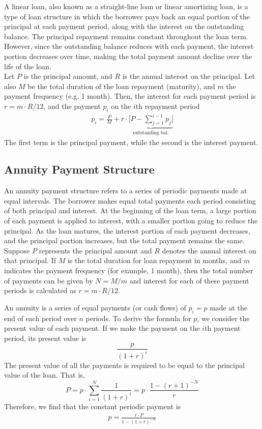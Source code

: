 \documentclass[11pt]{report}
\begin{document}
A linear loan, also known as a straight-line loan or linear amortizing loan, is a type of loan structure in which the borrower pays back an equal portion of the principal at each payment period, along with the interest on the outstanding balance. The principal repayment remains constant throughout the loan term. However, since the outstanding balance reduces with each payment, the interest portion decreases over time, making the total payment amount decline over the life of the loan.\\

Let $P$ is the principal amount, and $R$ is the annual interest on the principal. Let also $M$ be the total duration of the loan repayment (maturity), and $m$ the payment frequency (e.g. 1 month). Then, the interest for each payment period is $r=m\cdot R/12$, and the payment $p_i$ on the $i$th repayment period
\begin{align}
	p_i= \frac{P}{M}+r\cdot\underbrace{\bigg[P-\sum_{j=1}^{i-1}p_j\bigg]}_{\text{outstanding bal.}}
\end{align}
The first term is the principal payment, while the second is the interest payment.



\subsection{Annuity Payment Structure}

An annuity payment structure refers to a series of periodic payments made at equal intervals.  The borrower makes equal total payments each period consisting of both principal and interest. At the beginning of the loan term, a large portion of each payment is applied to interest, with a smaller portion going to reduce the principal. As the loan matures, the interest portion of each payment decreases, and the principal portion increases, but the total payment remains the same.\\

Suppose $P$ represents the principal amount and $R$ denotes the annual interest on that principal. If $M$ is the total duration for loan repayment in months, and $m$ indicates the payment frequency (for example, 1 month), then the total number of payments can be given by $N=M/m$ and interest for each of these payment periods is calculated as $r = m \cdot R/12$. 

An annuity is a series of equal payments (or cash flows) of $p_i=p$ made at the end of each period over $n$ periods. To derive the formula for $p$, we consider the present value of each payment. If we make the payment on the $i$th payment period, its present value is 
$$\frac{p}{(1+r)^i}$$
The present value of all the payments is required to be equal to the principal value of the loan. That is,
$$P=p\cdot \sum_{i=1}^N\frac{1}{(1+r)^i}=p\cdot\frac{1-(r+1)^{-N}}{r}$$
Therefore, we find that the constant periodic payment is
\begin{align}
	p=\frac{r\cdot P}{1-(1+r)^{-N}}
\end{align}
\end{document}
